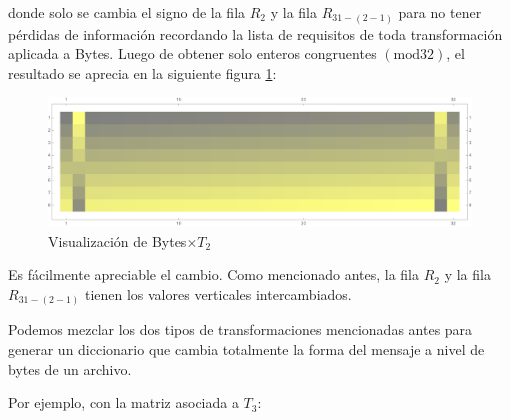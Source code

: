 \documentclass[a4paper]{article}
\begin{document}
donde solo se cambia el signo de la fila $R_2$ y la fila $R_{31 - (2 - 1)}$
para no tener pérdidas de información recordando la lista de requisitos de toda
transformación aplicada a Bytes. Luego de obtener solo enteros congruentes
$(\text{mod} 32)$, el resultado se aprecia en la siguiente figura
\ref{fig:filasC}:

\begin{figure}[H]
    \centering
    \includegraphics[width=\textwidth]{fila}
    \caption{Visualización de Bytes$\times T_2$}
    \label{fig:filasC}
\end{figure}

Es fácilmente apreciable el cambio. Como mencionado antes, la fila $R_2$ y la
fila $R_{31 - (2 - 1)}$ tienen los valores verticales intercambiados.

Podemos mezclar los dos tipos de transformaciones mencionadas antes para
generar un diccionario que cambia totalmente la forma del mensaje a nivel de
bytes de un archivo.

Por ejemplo, con la matriz asociada a $T_3$:
\end{document}
